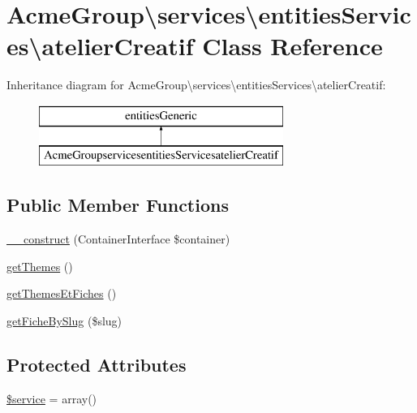 \hypertarget{class_acme_group_1_1services_1_1entities_services_1_1atelier_creatif}{\section{Acme\+Group\textbackslash{}services\textbackslash{}entities\+Services\textbackslash{}atelier\+Creatif Class Reference}
\label{class_acme_group_1_1services_1_1entities_services_1_1atelier_creatif}
}
Inheritance diagram for Acme\+Group\textbackslash{}services\textbackslash{}entities\+Services\textbackslash{}atelier\+Creatif\+:\begin{figure}[H]
\begin{center}
\leavevmode
\includegraphics[height=2.000000cm]{class_acme_group_1_1services_1_1entities_services_1_1atelier_creatif}
\end{center}
\end{figure}
\subsection*{Public Member Functions}
\begin{DoxyCompactItemize}
\item 
\hyperlink{class_acme_group_1_1services_1_1entities_services_1_1atelier_creatif_aa3e69931bb0001e558dbdddee5ddb66f}{\+\_\+\+\_\+construct} (Container\+Interface \$container)
\item 
\hyperlink{class_acme_group_1_1services_1_1entities_services_1_1atelier_creatif_ab1c5c9b8d5da2acc4bc124e95778976d}{get\+Themes} ()
\item 
\hyperlink{class_acme_group_1_1services_1_1entities_services_1_1atelier_creatif_a1b76bcbab440fa45cd036682289039f6}{get\+Themes\+Et\+Fiches} ()
\item 
\hyperlink{class_acme_group_1_1services_1_1entities_services_1_1atelier_creatif_a04184f2d1ee684184871ee11892fac27}{get\+Fiche\+By\+Slug} (\$slug)
\end{DoxyCompactItemize}
\subsection*{Protected Attributes}
\begin{DoxyCompactItemize}
\item 
\hyperlink{class_acme_group_1_1services_1_1entities_services_1_1atelier_creatif_ab2b15de4d0e90dadbf54e711d7f33ca6}{\$service} = array()
\end{DoxyCompactItemize}


